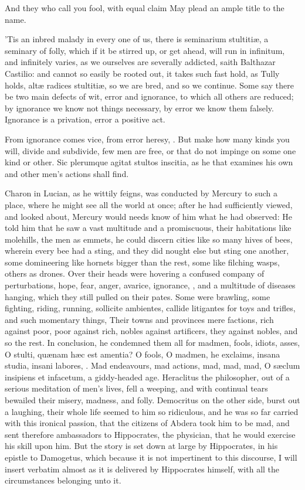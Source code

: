 {And they who call you fool, with equal claim
May plead an ample title to the name.

'Tis an inbred malady in every one of us, there is seminarium
stultiti\ae{}, a seminary of folly, which if it be stirred up, or get
ahead, will run in infinitum, and infinitely varies, as we ourselves
are severally addicted, saith Balthazar Castilio: and cannot so
easily be rooted out, it takes such fast hold, as Tully holds, alt\ae{}
radices stultiti\ae{}, so we are bred, and so we continue. Some say
there be two main defects of wit, error and ignorance, to which all
others are reduced; by ignorance we know not things necessary, by error
we know them falsely. Ignorance is a privation, error a positive act.

From ignorance comes vice, from error heresy, \etc. But make how many
kinds you will, divide and subdivide, few men are free, or that do not
impinge on some one kind or other. Sic plerumque agitat stultos
inscitia, as he that examines his own and other men's actions shall
find.

Charon in Lucian, as he wittily feigns, was conducted by Mercury
to such a place, where he might see all the world at once; after he had
sufficiently viewed, and looked about, Mercury would needs know of him
what he had observed: He told him that he saw a vast multitude and a
promiscuous, their habitations like molehills, the men as emmets, he
could discern cities like so many hives of bees, wherein every bee had
a sting, and they did nought else but sting one another, some
domineering like hornets bigger than the rest, some like filching
wasps, others as drones. Over their heads were hovering a confused
company of perturbations, hope, fear, anger, avarice, ignorance, \etc{},
and a multitude of diseases hanging, which they still pulled on their
pates. Some were brawling, some fighting, riding, running, sollicite
ambientes, callide litigantes for toys and trifles, and such momentary
things, Their towns and provinces mere factions, rich against poor,
poor against rich, nobles against artificers, they against nobles, and
so the rest. In conclusion, he condemned them all for madmen, fools,
idiots, asses, O stulti, qu\ae{}nam h\ae{}c est amentia? O fools, O madmen,
he exclaims, insana studia, insani labores, \etc{}. Mad endeavours, mad
actions, mad, mad, mad, O s\ae{}clum insipiens et infacetum, a
giddy-headed age. Heraclitus the philosopher, out of a serious
meditation of men's lives, fell a weeping, and with continual tears
bewailed their misery, madness, and folly. Democritus on the other
side, burst out a laughing, their whole life seemed to him so
ridiculous, and he was so far carried with this ironical passion, that
the citizens of Abdera took him to be mad, and sent therefore
ambassadors to Hippocrates, the physician, that he would exercise his
skill upon him. But the story is set down at large by Hippocrates, in
his epistle to Damogetus, which because it is not impertinent to this
discourse, I will insert verbatim almost as it is delivered by
Hippocrates himself, with all the circumstances belonging unto it.

}
